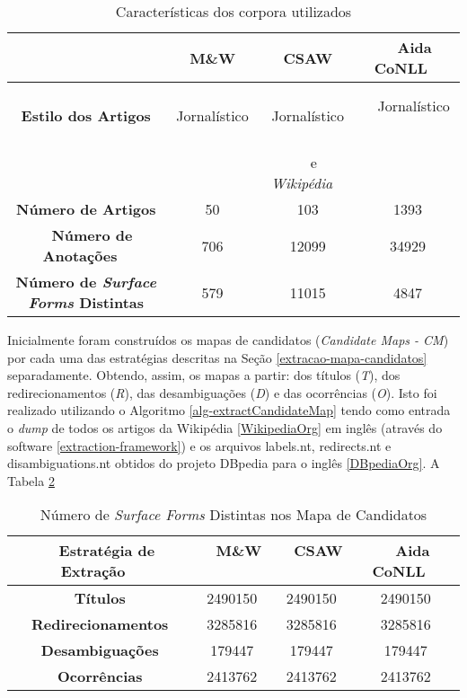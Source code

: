 \documentclass[10pt,a4paper]{llncs}
\begin{document}
{\begin{table} \label{tab-corpora}
\caption{Características dos corpora utilizados}
\centering
    \begin{tabular}{|c|c|c|c|}
    \hline
    ~                                    & {\bf M\&W} & {\bf CSAW}               & ~ {\bf Aida CoNLL} ~ \\ \hline
    {\bf Estilo dos Artigos}  & ~ Jornalístico ~          & ~ Jornalístico ~                & ~ Jornalístico ~                \\
    ~                                    & ~                     & ~ e {\it Wikipédia} ~ & ~                           \\ \hline
    {\bf Número de Artigos}   & 50                    & 103                                 & 1393                        \\ \hline
    ~ {\bf Número de Anotações} ~ & 706                   & 12099                               & 34929                       \\ \hline
    {\bf Número de \textit{Surface Forms} Distintas}   & 579                    & 11015                                 & 4847
                        \\ \hline
    \end{tabular}

\end{table}

Inicialmente foram construídos os mapas de candidatos (\textit{Candidate Maps - CM}) por cada uma das estratégias descritas na Seção \ref{extracao-mapa-candidatos} separadamente. Obtendo, assim, os mapas a partir: dos títulos (\textit{T}), dos redirecionamentos (\textit{R}), das desambiguações (\textit{D}) e das ocorrências (\textit{O}). Isto foi realizado utilizando o Algoritmo \ref{alg-extractCandidateMap} tendo como entrada o \textit{dump} de todos os artigos da Wikipédia \ref{WikipediaOrg} em inglês (através do software \ref{extraction-framework}) e os arquivos labels.nt, redirects.nt e disambiguations.nt obtidos do projeto DBpedia para o inglês \ref{DBpediaOrg}. A Tabela \ref{tab-cm-numSf}
\begin{table} \label{tab-cm-numSf}
\caption{Número de \textit{Surface Forms} Distintas nos Mapa de Candidatos}
\centering
    \begin{tabular}{|c|c|c|c|}
    \hline
    ~ {\bf Estratégia de Extração} ~ 	& ~ {\bf M\&W} ~ 	& ~ {\bf CSAW} ~ 	& ~ {\bf Aida CoNLL} ~\\ \hline  
    {\bf Títulos} 			& 2490150 	& 2490150	& 2490150 \\ \hline
    {\bf Redirecionamentos} 		& 3285816 	& 3285816	& 3285816 \\ \hline
    {\bf Desambiguações} 		& 179447	& 179447	& 179447 \\ \hline
    {\bf Ocorrências} 			& 2413762	& 2413762	& 2413762 \\ \hline
    \end{tabular}
\end{table}

}
\end{document}
